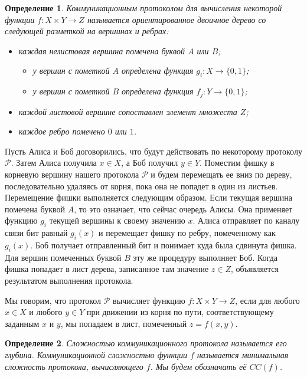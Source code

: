 \documentclass[a4paper]{article}
\newtheorem*{mdefinition}{Определение}
\begin{document}
\begin{mdefinition}
    Коммуникационным протоколом для вычисления некоторой функции $f:X\times Y\rightarrow Z$ называется
    ориентированное двоичное дерево со следующей разметкой на вершинах и ребрах:
    \begin{itemize}[noitemsep]
        \item каждая нелистовая вершина помечена буквой $A$ или $B$;
        \begin{itemize}[noitemsep]
			\item у вершин с пометкой $A$ определена функция $g_i:X\rightarrow \{0,1\}$;
			\item у вершин с пометкой $B$ определена функция $f_j:Y\rightarrow \{0,1\}$;
        \end{itemize}
        \item каждой листовой вершине сопоставлен элемент множеста $Z$;
        \item каждое ребро помечено $0$ или $1$.

    \end{itemize}
\end{mdefinition}

Пусть Алиса и Боб договорились, что будут действовать по некоторому протоколу $\mathcal{P}$. Затем
Алиса получила $x\in X$, а Боб получил $y\in Y$. Поместим фишку в корневую вершину нашего протокола
$\mathcal{P}$ и будем перемещать ее вниз по дереву, последовательно удаляясь от корня,
пока она не попадет в один из листьев. Перемещение фишки выполняется следующим образом. Если текущая 
вершина помечена буквой $A$, то это означает, что сейчас очередь Алисы. Она применяет функцию $g_i$ текущей 
вершины к своему значению $x$. Алиса отправляет по каналу связи бит равный $g_i(x)$ и перемещает
фишку по ребру, помеченному как $g_i(x)$. Боб получает отправленный бит и понимает куда была сдвинута фишка.
Для вершин помеченных буквой $B$ эту же процедуру выполняет Боб. Когда фишка попадает в лист дерева,
записанное там значение $z\in Z$, объявляется результатом выполнения протокола.

Мы говорим, что протокол $\mathcal{P}$ вычисляет функцию $f:X\times Y \rightarrow Z$, если для любого
$x\in X$ и любого $y\in Y$ при движении из корня по пути, соответствующему заданным $x$ и $y$,
мы попадаем в лист, помеченный $z=f(x,y)$.

\begin{mdefinition}
	Сложностью коммуникационного протокола называется его глубина. Коммуникационной сложностью функции 
	$f$ называется минимальная сложность протокола, вычисляющего $f$. Мы будем обозначать её $CC(f)$.
\end{mdefinition}
\end{document}

